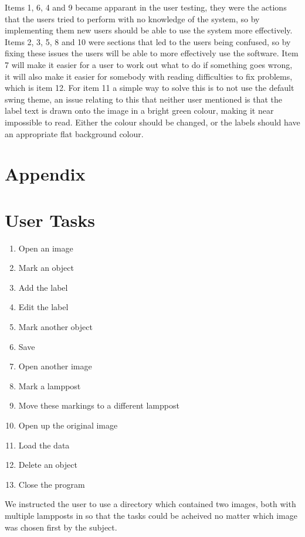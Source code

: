 \documentclass[a4paper,11pt,oneside]{article}
\begin{document}
Items 1, 6, 4 and 9 became apparant in the user testing, they were the actions that the users tried to perform with no knowledge of the system, so by implementing them new users should be able to use the system more effectively.  Items 2, 3, 5, 8 and 10 were sections that led to the users being confused, so by fixing these issues the users will be able to more effectively use the software.  Item 7 will make it easier for a user to work out what to do if something goes wrong, it will also make it easier for somebody with reading difficulties to fix problems, which is item 12.  For item 11 a simple way to solve this is to not use the default swing theme, an issue relating to this that neither user mentioned is that the label text is drawn onto the image in a bright green colour, making it near impossible to read.  Either the colour should be changed, or the labels should have an appropriate flat background colour.

\newpage
\section{Appendix}
\appendix

\section{User Tasks}
\label{sec:tasks}

\begin{enumerate}
\item Open an image
\item Mark an object
\item Add the label
\item Edit the label
\item Mark another object
\item Save
\item Open another image
\item Mark a lamppost
\item Move these markings to a different lamppost
\item Open up the original image
\item Load the data
\item Delete an object
\item Close the program
\end{enumerate}

We instructed the user to use a directory which contained two images, both with multiple lampposts in so that the tasks could be acheived no matter which image was chosen first by the subject.
\end{document}
